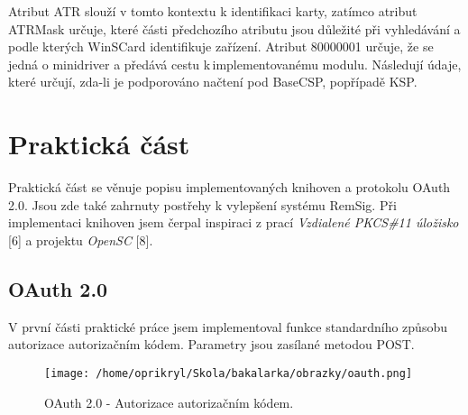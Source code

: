 \documentclass[]{fithesis3}
\begin{document}
		Atribut ATR slouží v tomto kontextu k identifikaci karty, zatímco atribut ATRMask určuje, 			které části předchozího atributu jsou důležité při vyhledávání a podle kterých WinSCard identifikuje zařízení. Atribut 80000001 určuje, že se jedná o minidriver a předává cestu k\,implementovanému modulu. Následují údaje, které určují, zda-li je podporováno načtení pod 		BaseCSP, popřípadě KSP.

\let\cleardoublepage\clearpage

\chapter{Praktická část}

Praktická část se věnuje popisu implementovaných knihoven a protokolu OAuth 2.0. Jsou zde také zahrnuty postřehy k vylepšení systému RemSig. Při implementaci knihoven jsem čerpal inspiraci z prací \textit{Vzdialené PKCS\#11 úložisko} [6] a projektu \textit{OpenSC} [8].

	\section{OAuth 2.0}

	V první části praktické práce jsem implementoval funkce standardního způsobu autorizace 			autorizačním kódem. Parametry jsou zasílané metodou POST.

	\begin{figure}[!ht]
		\begin{center}
  		\begin{minipage}{0.80\textwidth}
    			\texttt{[image: /home/oprikryl/Skola/bakalarka/obrazky/oauth.png]}
  		\end{minipage}
		\end{center}
 		\caption{OAuth 2.0 - Autorizace autorizačním kódem.}
  		\label{fig:oauth}
	\end{figure}
\end{document}
